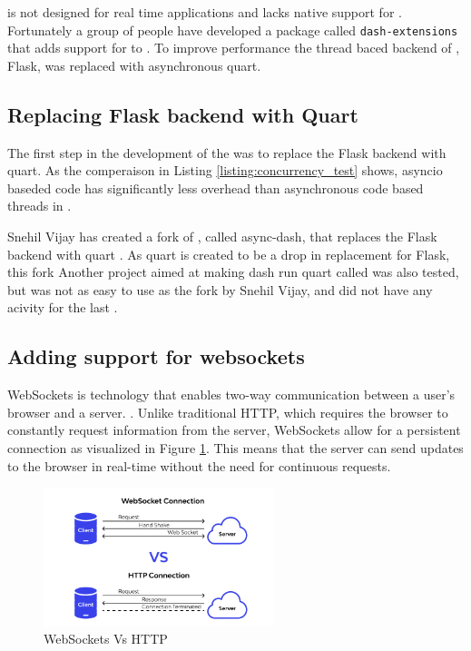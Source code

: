 \dash is not designed for real time applications and lacks native support for .
Fortunately a group of people have developed a package called \texttt{dash-extensions} that adds support for  to \dash \cite{eriksenDashExtensions}.
To improve performance the thread baced backend of \dash, Flask, was replaced with asynchronous \gls{quart}.

\subsection{Replacing Flask backend with Quart}
The first step in the development of the \guif was to replace the Flask backend with \gls{quart}.
As the comperaison in Listing \ref{listing:concurrency_test} shows, \gls{asyncio} baseded code has significantly less overhead than asynchronous code based threads in \py.


Snehil Vijay has created a fork of \dash, called \gls{async-dash}, that replaces the Flask backend with \gls{quart} \cite{vijaySnehilvjAsyncdash2023}.
As \gls{quart} is created to be a drop in replacement for Flask, this fork
Another project aimed at making \gls{dash} run \gls{quart} called  was also tested, but was not as easy to use as the fork by Snehil Vijay, and did not have any acivity for the last  \cite{legrandCodeFrequencyRichlegrand}.

\subsection{Adding support for websockets}
WebSockets is technology that enables two-way communication between a user's browser and a server.
\cite{farhutsWebSocketsBeginnersPart2019}.
Unlike traditional HTTP, which requires the browser to constantly request information from the server, WebSockets allow for a persistent connection as visualized in Figure \ref{fig:websockets_vs_http}\cite{farhutsWebSocketsBeginnersPart2019}.
This means that the server can send updates to the browser in real-time without the need for continuous requests.
\begin{figure}[H]
    \centering
    \includegraphics[width=0.6\textwidth]{figures/gui/http_vs_ws.png}
    \caption{WebSockets Vs HTTP \cite{wallarmWebSocketVsHTTP}}
    \label{fig:websockets_vs_http}
\end{figure}

